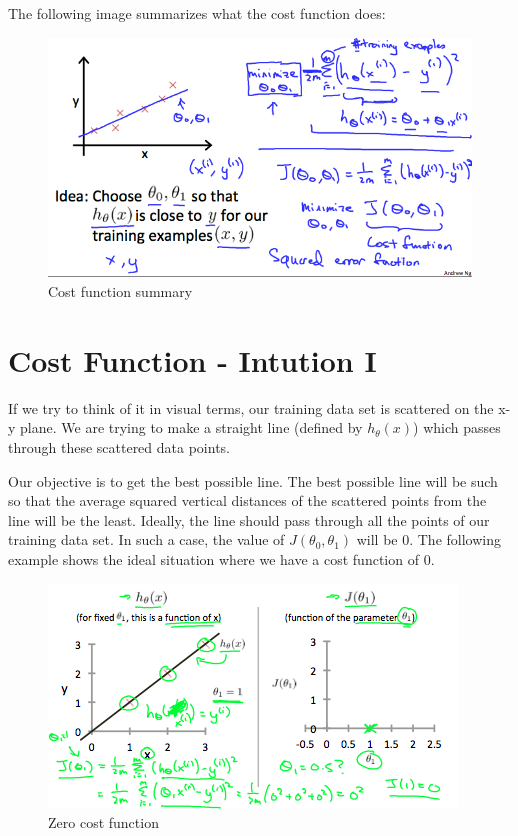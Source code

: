 \documentclass[
]{book}
\begin{document}
The following image summarizes what the cost function does:

\begin{figure}
\centering
\includegraphics{cost_function.png}
\caption{Cost function summary}
\end{figure}

\hypertarget{cost-function---intution-i}{%
\section{Cost Function - Intution I}\label{cost-function---intution-i}}

If we try to think of it in visual terms, our training data set is scattered on the x-y plane. We are trying to make a straight line (defined by \(h_\theta(x)\)) which passes through these scattered data points.

Our objective is to get the best possible line. The best possible line will be such so that the average squared vertical distances of the scattered points from the line will be the least. Ideally, the line should pass through all the points of our training data set. In such a case, the value of \(J(\theta_0, \theta_1)\) will be 0. The following example shows the ideal situation where we have a cost function of 0.

\begin{figure}
\centering
\includegraphics{Zero_cost_function.png}
\caption{Zero cost function}
\end{figure}
\end{document}
